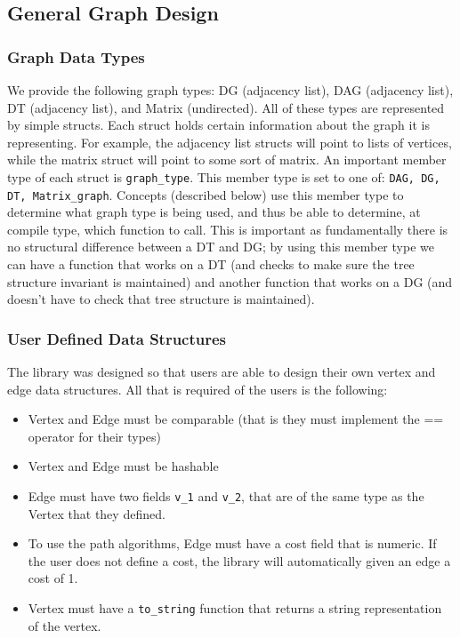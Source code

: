 \documentclass{article}
\begin{document}
\subsection{General Graph Design}
\subsubsection{Graph Data Types}
We provide the following graph types: DG (adjacency list), DAG (adjacency list), DT (adjacency list), and Matrix (undirected). All of these types are represented by simple structs. Each struct holds certain information about the graph it is representing. For example, the adjacency list structs will point to lists of vertices, while the matrix struct will point to some sort of matrix. An important member type of each struct is \texttt{graph\_type}. This member type is set to one of: \texttt{DAG, DG, DT, Matrix\_graph}. Concepts (described below) use this member type to determine what graph type is being used, and thus be able to determine, at compile type, which function to call. This is important as fundamentally there is no structural difference between a DT and DG; by using this member type we can have a function that works on a DT (and checks to make sure the tree structure invariant is maintained) and another function that works on a DG (and doesn't have to check that tree structure is maintained).

\subsubsection{User Defined Data Structures}
The library was designed so that users are able to design their own vertex and edge data structures. All that is required of the users is the following:
\begin{itemize}
\item Vertex and Edge must be comparable (that is they must implement the == operator for their types)
\item Vertex and Edge must be hashable
\item Edge must have two fields \texttt{v\_1} and \texttt{v\_2}, that are of the same type as the Vertex that they defined.
\item To use the path algorithms, Edge must have a cost field that is numeric. If the user does not define a cost, the library will automatically given an edge a cost of 1.
\item Vertex must have a \texttt{to\_string} function that returns a string representation of the vertex. 
\end{itemize}
\end{document}
